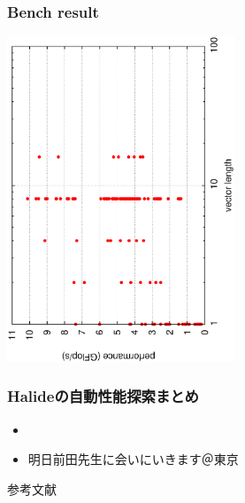 \documentclass[dvipdfmx,cjk]{beamer}
\begin{document}
\begin{frame}[fragile]\frametitle{Bench result}
\begin{center}
\includegraphics[height=9.7cm,angle=270]{figure/bench_vlen.eps}
\end{center}
\end{frame}



\begin{frame}\frametitle{Halideの自動性能探索まとめ}
\begin{itemize}
\item 
\item 明日前田先生に会いにいきます＠東京
\end{itemize}

\end{frame}




\begin{frame}[allowframebreaks]{参考文献}{}
  
  
\end{frame}



% 
% 
% 
\end{document}
